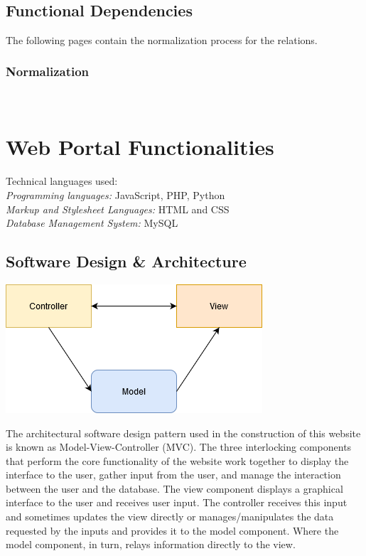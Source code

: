 \documentclass[11pt]{article}
\begin{document}
\newpage 
$ $
\newpage
$ $
\newpage 
\subsection{Functional Dependencies}
The following pages contain the normalization process for the relations.
\subsubsection{Normalization}
\newpage
$ $
\newpage
$ $
\newpage
$ $
\newpage
$ $
\newpage
$ $
\newpage
$ $
\newpage
$ $
\newpage
$ $
\newpage
$ $
\newpage
$ $
\newpage
$ $
\newpage
$ $
\newpage
$ $
\newpage
$ $
\newpage
$ $
\newpage
$ $
\newpage
$ $
\newpage
$ $
\newpage
$ $
\newpage
$ $
\newpage
$ $
\newpage
$ $
\newpage
\section{Web Portal Functionalities}
Technical languages used: \\
\textit{Programming languages:} JavaScript, PHP, Python \\
\textit{Markup and Stylesheet Languages:} HTML and CSS \\
\textit{Database Management System:} MySQL

\subsection{Software Design \& Architecture}

\includegraphics[scale=.7]{MVC.png}

The architectural software design pattern used in the construction of this website is known as Model-View-Controller (MVC). The three interlocking components that perform the core functionality of the website work together to display the interface to the user, gather input from the user, and manage the interaction between the user and the database. The view component displays a graphical interface to the user and receives user input. The controller receives this input and sometimes updates the view directly or manages/manipulates the data requested by the inputs and provides it to the model component. Where the model component, in turn, relays information directly to the view.
\end{document}
